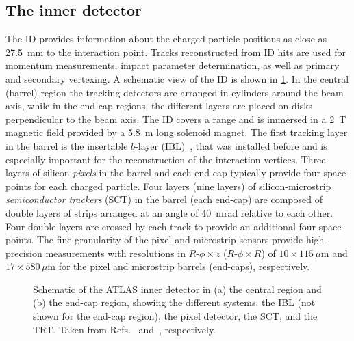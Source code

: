 \subsection{The inner detector}
\label{subsec:inner-detector}
The ID provides information about the charged-particle positions as close as \SI{27.5}{\milli\meter} to the interaction point.
Tracks reconstructed from ID hits are used for momentum measurements, impact parameter determination, as well as primary and secondary vertexing.
A schematic view of the ID is shown in \cref{fig:ATLASinnerdetector}.
In the central (barrel) region the tracking detectors are arranged in cylinders around the beam axis, while in the end-cap regions, the different layers are placed on disks perpendicular to the beam axis.
The ID covers a range  and is immersed in a \SI{2}{\tesla} magnetic field provided by a \SI{5.8}{\m} long solenoid magnet.
The first tracking layer in the barrel is the insertable $b$-layer (IBL)~\cite{ATLAS-TDR-19,PIX-2018-001}, that was installed before \RunTwo and is especially important for the reconstruction of the interaction vertices.
Three layers of silicon \emph{pixels} in the barrel and each end-cap typically provide four space points for each charged particle.
Four layers (nine layers) of silicon-microstrip \emph{semiconductor trackers} (SCT) in the barrel (each end-cap) are composed of double layers of strips arranged at an angle of \SI{40}{\milli\radian} relative to each other. Four double layers are crossed by each track to provide an additional four space points.
The fine granularity of the pixel and microstrip sensors provide high-precision measurements with resolutions in $R$-$\phi \times z$ ($R$-$\phi \times R$) of $10 \times 115\,\mu\text{m}$ and $17 \times 580\,\mu\text{m}$ for the pixel and microstrip barrels (end-caps), respectively.
\begin{landscape}
     \begin{figure}[t]
    \caption[Schematic of the ATLAS inner detector.]{Schematic of the ATLAS inner detector in (a) the central region and (b) the end-cap region, showing the different systems: the IBL (not shown for the end-cap region), the pixel detector, the SCT, and the TRT. Taken from Refs.~\cite{ATL-PHYS-PUB-2015-009} and~\cite{PERF-2007-01}, respectively.}
    \label{fig:ATLASinnerdetector}
\end{figure}
\end{landscape}
